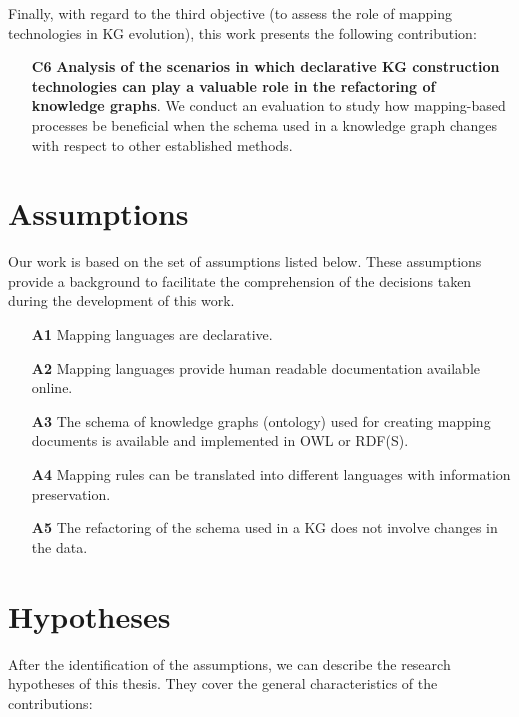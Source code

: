Finally, with regard to the third objective (to assess the role of mapping technologies in KG evolution), this work presents the following contribution:

\begin{enumerate}
    \item[\textbf{C6}]\textbf{Analysis of the scenarios in which declarative KG construction technologies can play a valuable role in the refactoring of knowledge graphs}. We conduct an evaluation to study how mapping-based processes be beneficial when the schema used in a knowledge graph changes with respect to other established methods.  %
\end{enumerate}


\section{Assumptions}
\label{sec:chp3-assumptions}
Our work is based on the set of assumptions listed below. These assumptions provide a background to facilitate the comprehension of the decisions taken during the development of this work. 


\begin{enumerate}
    \item[\textbf{A1}] Mapping languages are declarative.
    \item[\textbf{A2}] Mapping languages provide human readable documentation available online.
    \item[\textbf{A3}] The schema of knowledge graphs (ontology) used for creating mapping documents is available and implemented in OWL or RDF(S). 
    \item[\textbf{A4}] Mapping rules can be translated into different languages with information preservation. 
    \item[\textbf{A5}] The refactoring of the schema used in a KG does not involve changes in the data.
\end{enumerate}


\section{Hypotheses}
\label{sec:chp3-hypotheses}

After the identification of the assumptions, we can describe the research hypotheses  of this thesis. They cover the general characteristics of the contributions:

